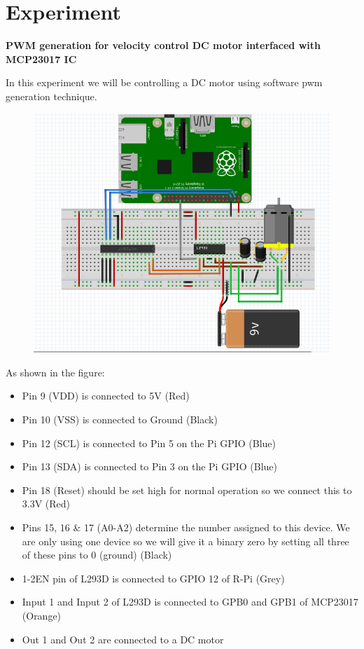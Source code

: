 \documentclass[11pt,a4paper]{article}
\begin{document}
    
    \newpage
	\section{Experiment}
	\textbf{PWM generation for velocity control DC motor interfaced with MCP23017 IC}
	
	In this experiment we will be controlling a DC motor using software pwm generation technique.
	  
	\begin{figure}[h!]
		\includegraphics[scale=0.6]{1.png}
		\centering
	\end{figure} 
	As shown in the figure:
	\begin{itemize}
		\item Pin 9 (VDD) is connected to 5V (Red)
		\item Pin 10 (VSS) is connected to Ground (Black)
		\item Pin 12 (SCL) is connected to Pin 5 on the Pi GPIO (Blue)
		\item Pin 13 (SDA) is connected to Pin 3 on the Pi GPIO (Blue)
		\item Pin 18 (Reset) should be set high for normal operation so we connect this to 3.3V (Red)
		\item Pins 15, 16 \& 17 (A0-A2) determine the number assigned to this device. We are only using one device so we will give it a binary zero by setting all three of these pins to 0 (ground) (Black)
		\item 1-2EN pin of L293D is connected to GPIO 12 of R-Pi (Grey)
		\item Input 1 and Input 2 of L293D is connected to GPB0 and GPB1 of MCP23017 (Orange)
		\item Out 1 and Out 2 are connected to a DC motor
	\end{itemize}
	
\end{document}
